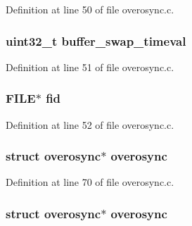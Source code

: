 Definition at line 50 of file overosync.\-c.

\hypertarget{group___telemetry_module_ga5c2ff66cb86affccb720ee8e0e55cbd7}{
\subsubsection[{buffer\-\_\-swap\-\_\-timeval}]{ {\bf uint32\-\_\-t} buffer\-\_\-swap\-\_\-timeval}}\label{group___telemetry_module_ga5c2ff66cb86affccb720ee8e0e55cbd7}


Definition at line 51 of file overosync.\-c.

\hypertarget{group___telemetry_module_ga646170d6f9e3b0d001430a771e9f2247}{
\subsubsection[{fid}]{\setlength{\rightskip}{0pt plus 5cm}F\-I\-L\-E$\ast$ fid}}\label{group___telemetry_module_ga646170d6f9e3b0d001430a771e9f2247}


Definition at line 52 of file overosync.\-c.

\hypertarget{group___telemetry_module_ga34ce26c29a4ded07cf5f562126682017}{
\subsubsection[{overosync}]{\setlength{\rightskip}{0pt plus 5cm}struct {\bf overosync}$\ast$ {\bf overosync}}}\label{group___telemetry_module_ga34ce26c29a4ded07cf5f562126682017}


Definition at line 70 of file overosync.\-c.

\hypertarget{group___telemetry_module_ga34ce26c29a4ded07cf5f562126682017}{
\subsubsection[{overosync}]{\setlength{\rightskip}{0pt plus 5cm}struct {\bf overosync}$\ast$ {\bf overosync}}}\label{group___telemetry_module_ga34ce26c29a4ded07cf5f562126682017}


